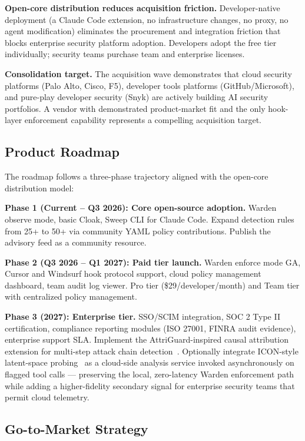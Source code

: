 \documentclass[11pt,letterpaper]{article}
\begin{document}
\textbf{Open-core distribution reduces acquisition friction.} Developer-native deployment
(a Claude Code extension, no infrastructure changes, no proxy, no agent modification)
eliminates the procurement and integration friction that blocks enterprise security
platform adoption. Developers adopt the free tier individually; security teams purchase
team and enterprise licenses.

\textbf{Consolidation target.} The acquisition wave demonstrates that cloud security
platforms (Palo Alto, Cisco, F5), developer tools platforms (GitHub/Microsoft), and
pure-play developer security (Snyk) are actively building AI security portfolios.
A vendor with demonstrated product-market fit and the only hook-layer enforcement
capability represents a compelling acquisition target.

\subsection{Product Roadmap}

The roadmap follows a three-phase trajectory aligned with the open-core distribution model:

\textbf{Phase 1 (Current -- Q3 2026): Core open-source adoption.} Warden observe mode,
basic Cloak, Sweep CLI for Claude Code. Expand detection rules from 25+ to 50+ via
community YAML policy contributions. Publish the advisory feed as a community resource.

\textbf{Phase 2 (Q3 2026 -- Q1 2027): Paid tier launch.} Warden enforce mode GA, Cursor
and Windsurf hook protocol support, cloud policy management dashboard, team audit log
viewer. Pro tier (\$29/developer/month) and Team tier with centralized policy management.

\textbf{Phase 3 (2027): Enterprise tier.} SSO/SCIM integration, SOC 2 Type II
certification, compliance reporting modules (ISO 27001, FINRA audit evidence),
enterprise support SLA. Implement the AttriGuard-inspired causal attribution extension
for multi-step attack chain detection~\citep{he2026attriguard}. Optionally integrate
ICON-style latent-space probing~\citep{wang2026icon} as a cloud-side analysis service
invoked asynchronously on flagged tool calls --- preserving the local, zero-latency
Warden enforcement path while adding a higher-fidelity secondary signal for enterprise
security teams that permit cloud telemetry.

\subsection{Go-to-Market Strategy}
\end{document}
